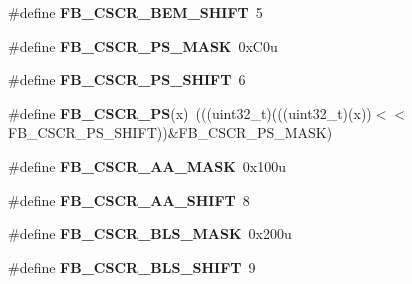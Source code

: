 \begin{DoxyCompactItemize}
\item 
\#define {\bfseries F\+B\+\_\+\+C\+S\+C\+R\+\_\+\+B\+E\+M\+\_\+\+S\+H\+I\+FT}~5\hypertarget{group__FB__Register__Masks_ga2dd3f47a9401af7ae8838b7dc7c379f8}{}\label{group__FB__Register__Masks_ga2dd3f47a9401af7ae8838b7dc7c379f8}

\item 
\#define {\bfseries F\+B\+\_\+\+C\+S\+C\+R\+\_\+\+P\+S\+\_\+\+M\+A\+SK}~0x\+C0u\hypertarget{group__FB__Register__Masks_ga07623c4ea4b4dfdc64c7dc0431719350}{}\label{group__FB__Register__Masks_ga07623c4ea4b4dfdc64c7dc0431719350}

\item 
\#define {\bfseries F\+B\+\_\+\+C\+S\+C\+R\+\_\+\+P\+S\+\_\+\+S\+H\+I\+FT}~6\hypertarget{group__FB__Register__Masks_ga2cd33266c104fc645dcadaea7e659aa8}{}\label{group__FB__Register__Masks_ga2cd33266c104fc645dcadaea7e659aa8}

\item 
\#define {\bfseries F\+B\+\_\+\+C\+S\+C\+R\+\_\+\+PS}(x)~(((uint32\+\_\+t)(((uint32\+\_\+t)(x))$<$$<$F\+B\+\_\+\+C\+S\+C\+R\+\_\+\+P\+S\+\_\+\+S\+H\+I\+FT))\&F\+B\+\_\+\+C\+S\+C\+R\+\_\+\+P\+S\+\_\+\+M\+A\+SK)\hypertarget{group__FB__Register__Masks_ga2268294cb3a73b4f9643e72aba119dec}{}\label{group__FB__Register__Masks_ga2268294cb3a73b4f9643e72aba119dec}

\item 
\#define {\bfseries F\+B\+\_\+\+C\+S\+C\+R\+\_\+\+A\+A\+\_\+\+M\+A\+SK}~0x100u\hypertarget{group__FB__Register__Masks_gae26d2b6451432c0000d30a23e541020f}{}\label{group__FB__Register__Masks_gae26d2b6451432c0000d30a23e541020f}

\item 
\#define {\bfseries F\+B\+\_\+\+C\+S\+C\+R\+\_\+\+A\+A\+\_\+\+S\+H\+I\+FT}~8\hypertarget{group__FB__Register__Masks_gaf3d9d750b7dddf0d1df65c98d7ecc7e1}{}\label{group__FB__Register__Masks_gaf3d9d750b7dddf0d1df65c98d7ecc7e1}

\item 
\#define {\bfseries F\+B\+\_\+\+C\+S\+C\+R\+\_\+\+B\+L\+S\+\_\+\+M\+A\+SK}~0x200u\hypertarget{group__FB__Register__Masks_gac8f4e3d4dba2c5e902c51e82cd870d9f}{}\label{group__FB__Register__Masks_gac8f4e3d4dba2c5e902c51e82cd870d9f}

\item 
\#define {\bfseries F\+B\+\_\+\+C\+S\+C\+R\+\_\+\+B\+L\+S\+\_\+\+S\+H\+I\+FT}~9\hypertarget{group__FB__Register__Masks_gabbdaea319c238ce8fc0ba6d79e29b411}{}\label{group__FB__Register__Masks_gabbdaea319c238ce8fc0ba6d79e29b411}


\end{DoxyCompactItemize}
